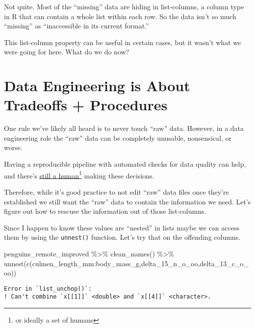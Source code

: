 \documentclass[
  letterpaper,
  DIV=11,
  numbers=noendperiod]{scrreprt}
\newenvironment{Shaded}{\begin{snugshade}}{\end{snugshade}}
\newcommand{\FunctionTok}[1]{\textcolor[rgb]{0.28,0.35,0.67}{#1}}
\newcommand{\NormalTok}[1]{\textcolor[rgb]{0.00,0.23,0.31}{#1}}
\newcommand{\SpecialCharTok}[1]{\textcolor[rgb]{0.37,0.37,0.37}{#1}}
\begin{document}
Not quite. Most of the ``missing'' data are hiding in list-columns, a
column type in R that can contain a whole list within each row. So the
data isn't so much ``missing'' as ``inaccessible in its current
format.''

This list-column property can be useful in certain cases, but it wasn't
what we were going for here. What do we do now?

\hypertarget{data-engineering-is-about-tradeoffs-procedures}{%
\section{Data Engineering is About Tradeoffs +
Procedures}\label{data-engineering-is-about-tradeoffs-procedures}}

One rule we've likely all heard is to never touch ``raw'' data. However,
in a data engineering role the ``raw'' data can be completely unusable,
nonsensical, or worse.

Having a reproducible pipeline with automated checks for data quality
can help, and there's
\href{https://www.thenewatlantis.com/publications/why-data-is-never-raw}{still
a human\footnote{or ideally a set of humans} making these decisions}.

Therefore, while it's good practice to not edit ``raw'' data files once
they're established we still want the ``raw'' data to contain the
information we need. Let's figure out how to rescuse the information out
of those list-columns.

Since I happen to know these values are ``nested'' in lists maybe we can
access them by using the \texttt{unnest()} function. Let's try that on
the offending columns.

\begin{Shaded}
\begin{Highlighting}[]
\NormalTok{penguins\_remote\_improved }\SpecialCharTok{\%\textgreater{}\%}
  \FunctionTok{clean\_names}\NormalTok{() }\SpecialCharTok{\%\textgreater{}\%}
  \FunctionTok{unnest}\NormalTok{(}\FunctionTok{c}\NormalTok{(culmen\_length\_mm}\SpecialCharTok{:}\NormalTok{body\_mass\_g,delta\_15\_n\_o\_oo,delta\_13\_c\_o\_oo))}
\end{Highlighting}
\end{Shaded}

\begin{verbatim}
Error in `list_unchop()`:
! Can't combine `x[[1]]` <double> and `x[[4]]` <character>.
\end{verbatim}
\end{document}
